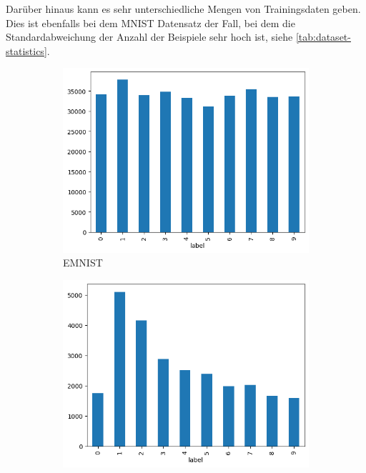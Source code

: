Darüber hinaus kann es sehr unterschiedliche Mengen von Trainingsdaten geben. Dies ist ebenfalls bei dem MNIST Datensatz der Fall, bei dem die Standardabweichung der Anzahl der Beispiele sehr hoch ist, siehe \autoref{tab:dataset-statistics}.


\begin{figure}[tb]
	\centering
	\begin{subfigure}{0.3\textwidth}
		\centering
		\includegraphics[width=\textwidth]{Bilder/emnist_label_distribution.png}
		\caption{EMNIST}
	\end{subfigure}
	\begin{subfigure}{0.3\textwidth}
		\centering
		\includegraphics[width=\textwidth]{Bilder/svhn_label_distribution.png}

\end{subfigure}
\end{figure}
